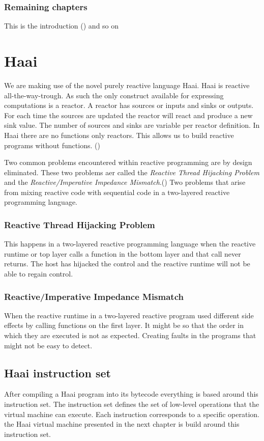 \documentclass[a4paper]{book}
\begin{document}
\subsection{Remaining chapters}
This is the introduction (\cite{oeyen2022reactive}) and so on 


\chapter{Haai}
We are making use of the novel purely reactive language Haai. Haai is reactive all-the-way-trough. As such the only construct available for expressing computations is a reactor. A reactor has sources or inputs and sinks or outputs. For each time the sources are updated the reactor will react and produce a new sink value. The number of sources and sinks are variable per reactor definition. In Haai there are no functions only reactors. This allows us to build reactive programs without functions. (\cite{oeyen_reactive_2024})

 Two common problems encountered within reactive programming are by design eliminated. These two problems aer called the \textit{Reactive Thread Hijacking Problem} and the \textit{Reactive/Imperative Impedance Mismatch}.(\cite{vonder_tackling_2020}) Two problems that arise from mixing reactive code with sequential code in a two-layered reactive programming language. 

\subsection*{Reactive Thread Hijacking Problem}
This happens in a two-layered reactive programming language when the reactive runtime or top layer calls a function in the bottom layer and that call never returns. The host has hijacked the control and the reactive runtime will not be able to regain control.  

\subsection*{Reactive/Imperative Impedance Mismatch}
When the reactive runtime in a two-layered reactive program used different side effects by calling functions on the first layer. It might be so that the order in which they are executed is not as expected. Creating faults in the programs that might not be easy to detect.
\section{Haai instruction set}
After compiling a Haai program into its bytecode everything is based around this instruction set. The instruction set defines the set of low-level operations that the virtual machine can execute. Each instruction corresponds to a specific operation. the Haai virtual machine presented in the next chapter is build around this instruction set. 
\end{document}
